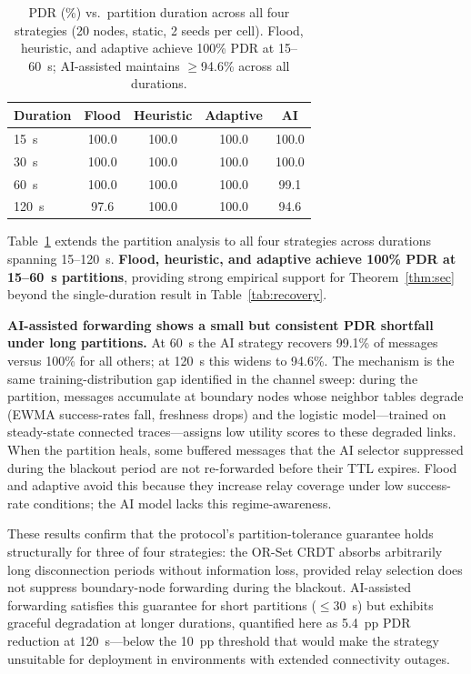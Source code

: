 \documentclass[conference]{IEEEtran}
\begin{document}
\begin{table}[!t]
  \centering
  \caption{PDR (\%) vs.\ partition duration across all four strategies
           (20 nodes, static, 2 seeds per cell).  Flood, heuristic, and
           adaptive achieve 100\% PDR at 15--60~s; AI-assisted maintains
           $\geq$94.6\% across all durations.}
  \label{tab:partition_ext}
  \begin{tabular}{lcccc}
    \toprule
    \textbf{Duration} & \textbf{Flood} & \textbf{Heuristic} & \textbf{Adaptive} & \textbf{AI} \\
    \midrule
    15~s  & 100.0 & 100.0 & 100.0 & 100.0 \\
    30~s  & 100.0 & 100.0 & 100.0 & 100.0 \\
    60~s  & 100.0 & 100.0 & 100.0 &  99.1 \\
    120~s &  97.6 & 100.0 & 100.0 &  94.6 \\
    \bottomrule
  \end{tabular}
\end{table}

Table~\ref{tab:partition_ext} extends the partition analysis to all four strategies
across durations spanning 15--120~s.  \textbf{Flood, heuristic, and adaptive
achieve 100\% PDR at 15--60~s partitions}, providing strong empirical support for
Theorem~\ref{thm:sec} beyond the single-duration result in Table~\ref{tab:recovery}.

\textbf{AI-assisted forwarding shows a small but consistent PDR shortfall under
long partitions.}  At 60~s the AI strategy recovers 99.1\% of messages versus
100\% for all others; at 120~s this widens to 94.6\%.  The mechanism is the
same training-distribution gap identified in the channel sweep: during the
partition, messages accumulate at boundary nodes whose neighbor tables degrade
(EWMA success-rates fall, freshness drops) and the logistic model---trained on
steady-state connected traces---assigns low utility scores to these degraded
links.  When the partition heals, some buffered messages that the AI selector
suppressed during the blackout period are not re-forwarded before their TTL
expires.  Flood and adaptive avoid this because they increase relay coverage
under low success-rate conditions; the AI model lacks this regime-awareness.

These results confirm that the protocol's partition-tolerance guarantee holds
structurally for three of four strategies: the OR-Set CRDT absorbs arbitrarily
long disconnection periods without information loss, provided relay selection
does not suppress boundary-node forwarding during the blackout.  AI-assisted
forwarding satisfies this guarantee for short partitions ($\leq$30~s) but
exhibits graceful degradation at longer durations, quantified here as 5.4~pp PDR
reduction at 120~s---below the 10~pp threshold that would make the strategy
unsuitable for deployment in environments with extended connectivity outages.
\end{document}
